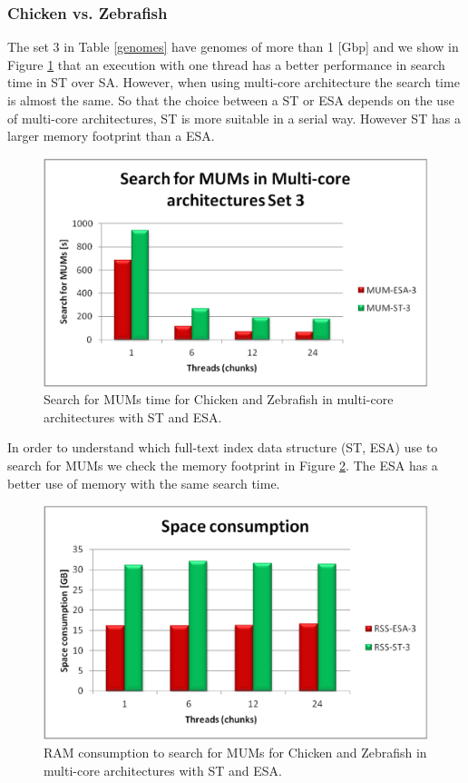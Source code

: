 \documentclass[runningheads,a4paper]{llncs}
\begin{document}
\subsubsection{Chicken vs. Zebrafish}
The set 3 in Table \ref{genomes} have genomes of more than 1 [Gbp] and we show in Figure \ref{fig:chicken-mum} that an execution with one thread has a better performance in search time in ST over SA. However, when using multi-core architecture the search time is almost the same. So that the choice between a ST or ESA depends on the use of multi-core architectures, ST is more suitable in a serial way. However ST has a larger memory footprint than a ESA.
\begin{figure}[h]
  \centering
  \includegraphics[scale=0.3]{chicken-MUM.eps}
  \caption{Search for MUMs time for Chicken and Zebrafish in multi-core architectures with ST and ESA.}
  \label{fig:chicken-mum}
\end{figure}  
In order to understand which full-text index data structure (ST, ESA) use to search for MUMs we check the memory footprint in Figure \ref{fig:chicken-ram}. The ESA has a better use of memory with the same search time.
\begin{figure}[h]
  \centering
  \includegraphics[scale=0.65]{chicken-RAM.eps}
  \caption{RAM consumption to search for MUMs for Chicken and Zebrafish in multi-core architectures with ST and ESA.}
  \label{fig:chicken-ram}
\end{figure}  
\end{document}
